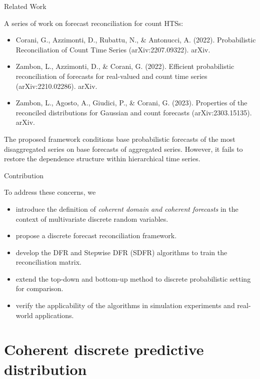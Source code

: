 \documentclass[12pt]{beamer}
\begin{document}
\begin{frame}{Related Work}

A series of work on forecast reconciliation for count HTSs:

\begin{itemize}
    \fontsize{9}{10.2}\selectfont
    \item Corani, G., Azzimonti, D., Rubattu, N., \& Antonucci, A. (2022). Probabilistic Reconciliation of Count Time Series (arXiv:2207.09322). arXiv.
    \item Zambon, L., Azzimonti, D., \& Corani, G. (2022). Efficient probabilistic reconciliation of forecasts for real-valued and count time series (arXiv:2210.02286). arXiv.
    \item Zambon, L., Agosto, A., Giudici, P., \& Corani, G. (2023). Properties of the reconciled distributions for Gaussian and count forecasts (arXiv:2303.15135). arXiv.
\end{itemize}

The proposed framework conditions base probabilistic forecasts of the most disaggregated series on base forecasts of aggregated series. However, it fails to restore the dependence structure within hierarchical time series.

\end{frame}

\begin{frame}{Contribution}

To address these concerns, we 

\begin{itemize}
    \item introduce the definition of \textit{coherent domain and coherent forecasts} in the context of multivariate discrete random variables.
    \item propose a discrete forecast reconciliation framework.
    \item develop the DFR and Stepwise DFR (SDFR) algorithms to train the reconciliation matrix.
    \item extend the top-down and bottom-up method to discrete probabilistic setting for comparison.
    \item verify the applicability of the algorithms in simulation experiments and real-world applications.
\end{itemize}

\end{frame}



\section{Coherent discrete predictive distribution}
\end{document}
